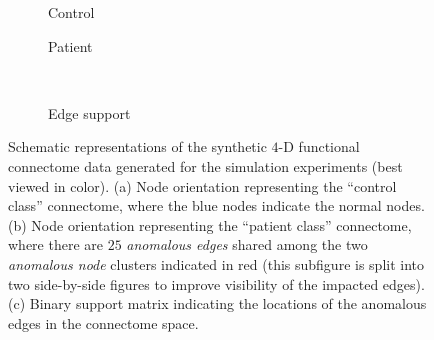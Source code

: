 \begin{figure}
	\centering
	\begin{subfigure}[b]{0.25\linewidth}
		 \centering
		 \resizebox{0.94\linewidth}{!}{}
		 \caption{Control}
		 \label{subfig:sim,conn,struct,hc}
	\end{subfigure}
	\hspace{-4pt}
	\begin{subfigure}[b]{0.5\linewidth}
		 \centering
		 \resizebox{0.94\linewidth}{!}{}
		 \caption{Patient}
		 \label{subfig:sim,conn,struct,ds}
	\end{subfigure}
	\begin{subfigure}[b]{0.235\linewidth}
		 \centering
		 \vspace{-5pt}\\
		 \caption{Edge support}
		 \label{subfig:sim,conn,struct,supp}
	\end{subfigure}
	\vspace{-12pt}
	\caption{
		Schematic representations of the synthetic $4$-D functional connectome data generated for the simulation experiments (best viewed in color). 
		(a) Node orientation representing the ``control class'' connectome, where the blue nodes indicate
the normal nodes.
		(b) Node orientation representing the ``patient class'' connectome, where there are $25$ \emph{anomalous edges} shared among the two \emph{anomalous node} clusters indicated in red (this subfigure is split into two side-by-side figures to improve visibility of the impacted edges).
		(c) Binary support matrix indicating the locations of the anomalous edges in the connectome space.
	}
	\label{fig:sim,conn,struct}
\end{figure}

